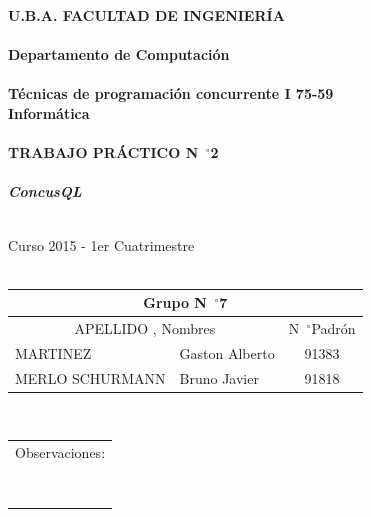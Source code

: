 \documentclass[11pt,spanish,a4paper,openany,notitlepage]{article}
\newcommand{\grad}{\hspace{-2mm}$\phantom{a}^{\circ}$} %
\begin{document}
\setcounter{page}{0}

\begin{center}
\textbf{\LARGE U.B.A.    FACULTAD DE INGENIERÍA\\
$\phantom{a}$\\
Departamento de Computación\\
$\phantom{a}$\\
Técnicas de programación concurrente I  75-59\\
Informática\\
$\phantom{a}$\\
TRABAJO PRÁCTICO N\grad 2\\
$\phantom{a}$\\
\textit{ConcusQL}}

\end{center}
$\phantom{a}$\\
Curso 2015 - 1er Cuatrimestre\\
\phantom{a}\\

\begin{tabular}{| l l |  r}%
\hline
\multicolumn{3}{|c|}{Grupo N\grad 7}\\
\hline
\multicolumn{2}{|c|}{APELLIDO , Nombres} &\multicolumn{1}{c|}{N\grad  Padrón}\\
\hline
MARTINEZ & Gaston Alberto & \multicolumn{1}{c|}{91383}\\ \hline
MERLO SCHURMANN  & Bruno Javier  & \multicolumn{1}{c|}{91818}\\ \hline
\end{tabular}
\\

\phantom{X\\X\\X\\X\\X\\}
\begin{tabular}{|l|}%
\hline
Observaciones: \\
\phantom{XXXXXXXXXXXXXXXXXXXXXXXXXXXXXXXXXXXXXXXXXXXXXXX}\\
\phantom{XXXXXXXXXXXXXXXXXXXXXXXXXXXXXXXXXXXXXXXXXXXXXXX}\\
\phantom{XXXXXXXXXXXXXXXXXXXXXXXXXXXXXXXXXXXXXXXXXXXXXXX}\\
\phantom{XXXXXXXXXXXXXXXXXXXXXXXXXXXXXXXXXXXXXXXXXXXXXXX}\\
\phantom{XXXXXXXXXXXXXXXXXXXXXXXXXXXXXXXXXXXXXXXXXXXXXXX}\\
\phantom{XXXXXXXXXXXXXXXXXXXXXXXXXXXXXXXXXXXXXXXXXXXXXXX}\\
\phantom{XXXXXXXXXXXXXXXXXXXXXXXXXXXXXXXXXXXXXXXXXXXXXXX}\\
\phantom{XXXXXXXXXXXXXXXXXXXXXXXXXXXXXXXXXXXXXXXXXXXXXXX}\\
\hline
\end{tabular}
\end{document}
